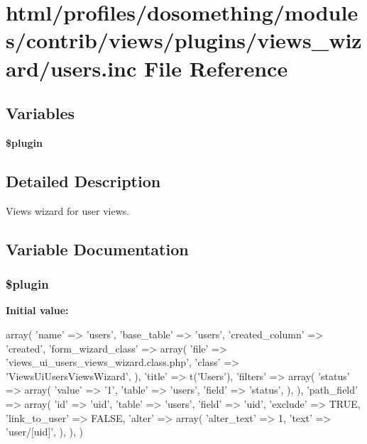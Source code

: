 \hypertarget{users_8inc}{
\section{html/profiles/dosomething/modules/contrib/views/plugins/views\_\-wizard/users.inc File Reference}
\label{users_8inc}
}
\subsection*{Variables}
\begin{DoxyCompactItemize}
\item 
{\bfseries \$plugin}
\end{DoxyCompactItemize}


\subsection{Detailed Description}
Views wizard for user views. 

\subsection{Variable Documentation}
\hypertarget{users_8inc_ada8a7130088351710bb02ed622d6bf65}{
\subsubsection[{\$plugin}]{\setlength{\rightskip}{0pt plus 5cm}\$plugin}}
\label{users_8inc_ada8a7130088351710bb02ed622d6bf65}
{\bfseries Initial value:}
\begin{DoxyCode}
 array(
  'name' => 'users',
  'base_table' => 'users',
  'created_column' => 'created',
  'form_wizard_class' => array(
    'file' => 'views_ui_users_views_wizard.class.php',
    'class' => 'ViewsUiUsersViewsWizard',
  ),
  'title' => t('Users'),
  'filters' => array(
    'status' => array(
      'value' => '1',
      'table' => 'users',
      'field' => 'status',
    ),
  ),
  'path_field' => array(
    'id' => 'uid',
    'table' => 'users',
    'field' => 'uid',
    'exclude' => TRUE,
    'link_to_user' => FALSE,
    'alter' => array(
      'alter_text' => 1,
      'text' => 'user/[uid]',
    ),
  ),
)
\end{DoxyCode}
